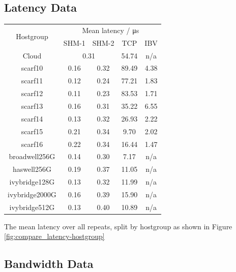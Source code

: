\documentclass{article}
\begin{document}
    \subsection{Latency Data}
        \label{appendix:latency-data}

        \begin{center}
            \centering
            \begin{tabular}{ |c||c|c|c|c|  }
             \hline
             \multirow{2}{*}{Hostgroup} & \multicolumn{4}{c|}{Mean latency / \si{\micro\second}} \\
             \cline{2-5}
                                      & SHM-1 & SHM-2 & TCP & IBV\\
             \hline
                Cloud & \multicolumn{2}{c|}{0.31} & 54.74 & n/a\\
                scarf10 & 0.16 & 0.32 & 89.49 & 4.38\\
                scarf11 & 0.12 & 0.24 & 77.21 & 1.83\\
                scarf12 & 0.11 & 0.23 & 83.53 & 1.71\\
                scarf13 & 0.16 & 0.31 & 35.22 & 6.55\\
                scarf14 & 0.13 & 0.32 & 26.93 & 2.22\\
                scarf15 & 0.21 & 0.34 & 9.70 & 2.02\\
                scarf16 & 0.22 & 0.34 & 16.44 & 1.47\\
                broadwell256G & 0.14 & 0.30 & 7.17 & n/a\\
                haswell256G & 0.19 & 0.37 & 11.05 & n/a\\
                ivybridge128G & 0.13 & 0.32 & 11.99 & n/a\\
                ivybridge2000G & 0.16 & 0.39 & 15.90 & n/a\\
                ivybridge512G & 0.13 & 0.40 & 10.89 & n/a\\

             \hline
            \end{tabular}
            \captionsetup{type=table}
            \caption{The mean latency over all repeats, split by hostgroup as shown in Figure \ref{fig:compare_latency-hostgroup}}
        \end{center}






    \subsection{Bandwidth Data}
        \label{appendix:bandwidth-data}
\end{document}
